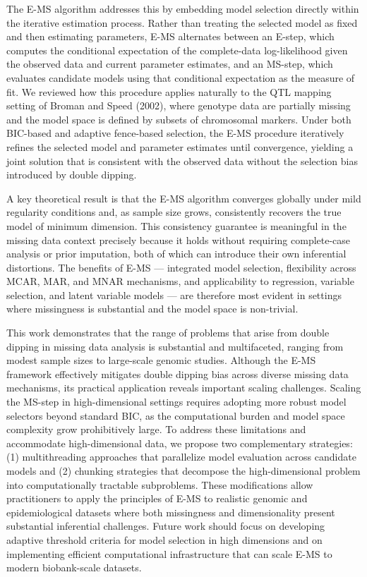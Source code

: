 \documentclass[
  12pt,
]{article}
\begin{document}
The E-MS algorithm addresses this by embedding model selection directly 
within the iterative estimation process. Rather than treating the selected 
model as fixed and then estimating parameters, E-MS alternates between an 
E-step, which computes the conditional expectation of the complete-data 
log-likelihood given the observed data and current parameter estimates, and 
an MS-step, which evaluates candidate models using that conditional 
expectation as the measure of fit. We reviewed how this procedure applies 
naturally to the QTL mapping setting of Broman and Speed (2002), where 
genotype data are partially missing and the model space is defined by subsets 
of chromosomal markers. Under both BIC-based and adaptive fence-based 
selection, the E-MS procedure iteratively refines the selected model and 
parameter estimates until convergence, yielding a joint solution that is 
consistent with the observed data without the selection bias introduced by 
double dipping.

A key theoretical result is that the E-MS algorithm converges globally under 
mild regularity conditions and, as sample size grows, consistently recovers 
the true model of minimum dimension. This consistency guarantee is meaningful 
in the missing data context precisely because it holds without requiring 
complete-case analysis or prior imputation, both of which can introduce their 
own inferential distortions. The benefits of E-MS — integrated model 
selection, flexibility across MCAR, MAR, and MNAR mechanisms, and 
applicability to regression, variable selection, and latent variable models — 
are therefore most evident in settings where missingness is substantial and 
the model space is non-trivial.

This work demonstrates that the range of problems that arise from double 
dipping in missing data analysis is substantial and multifaceted, ranging 
from modest sample sizes to large-scale genomic studies. Although the E-MS 
framework effectively mitigates double dipping bias across diverse missing 
data mechanisms, its practical application reveals important scaling 
challenges. Scaling the MS-step in high-dimensional settings requires 
adopting more robust model selectors beyond standard BIC, as the 
computational burden and model space complexity grow prohibitively large. 
To address these limitations and accommodate high-dimensional data, we 
propose two complementary strategies: (1) multithreading approaches that 
parallelize model evaluation across candidate models and (2) chunking 
strategies that decompose the high-dimensional problem into computationally 
tractable subproblems. These modifications allow practitioners to apply the 
principles of E-MS to realistic genomic and epidemiological datasets where 
both missingness and dimensionality present substantial inferential 
challenges. Future work should focus on developing adaptive threshold 
criteria for model selection in high dimensions and on implementing efficient 
computational infrastructure that can scale E-MS to modern 
biobank-scale datasets.
\end{document}

